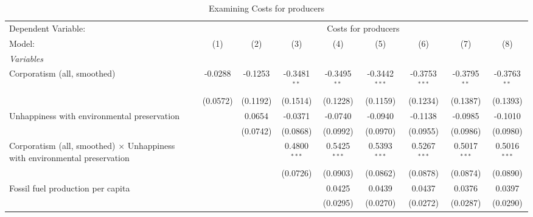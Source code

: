 
\begin{table}[htbp]
   \caption{Examining Costs for producers}
   \centering
   \begin{tabular}{lcccccccc}
      \tabularnewline \midrule \midrule
      Dependent Variable: & \multicolumn{8}{c}{Costs for producers}\\
      Model:                                                                            & (1)      & (2)      & (3)            & (4)            & (5)             & (6)             & (7)            & (8)\\  
      \midrule
      \emph{Variables}\\
      Corporatism (all, smoothed)                                                       & -0.0288  & -0.1253  & -0.3481$^{**}$ & -0.3495$^{**}$ & -0.3442$^{***}$ & -0.3753$^{***}$ & -0.3795$^{**}$ & -0.3763$^{**}$\\   
                                                                                        & (0.0572) & (0.1192) & (0.1514)       & (0.1228)       & (0.1159)        & (0.1234)        & (0.1387)       & (0.1393)\\   
      Unhappiness with environmental preservation                                       &          & 0.0654   & -0.0371        & -0.0740        & -0.0940         & -0.1138         & -0.0985        & -0.1010\\   
                                                                                        &          & (0.0742) & (0.0868)       & (0.0992)       & (0.0970)        & (0.0955)        & (0.0986)       & (0.0980)\\   
      Corporatism (all, smoothed) $\times$ Unhappiness with environmental preservation  &          &          & 0.4800$^{***}$ & 0.5425$^{***}$ & 0.5393$^{***}$  & 0.5267$^{***}$  & 0.5017$^{***}$ & 0.5016$^{***}$\\   
                                                                                        &          &          & (0.0726)       & (0.0903)       & (0.0862)        & (0.0878)        & (0.0874)       & (0.0890)\\   
      Fossil fuel production per capita                                                 &          &          &                & 0.0425         & 0.0439          & 0.0437          & 0.0376         & 0.0397\\   
                                                                                        &          &          &                & (0.0295)       & (0.0270)        & (0.0272)        & (0.0287)       & (0.0290)\\   

\end{tabular}
\end{table}
